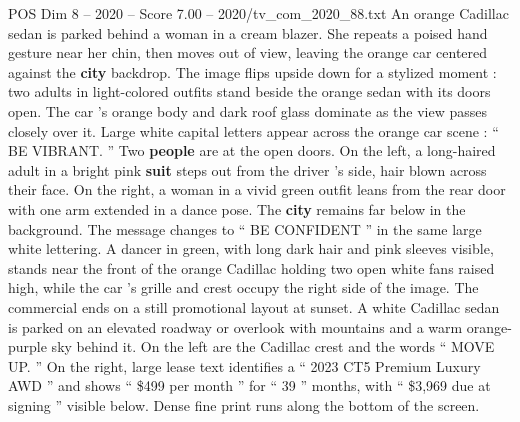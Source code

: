 \begin{textsample}{POS Dim 8 – 2020 – Score 7.00 – 2020/tv\_com\_2020\_88.txt}
An orange Cadillac sedan is parked behind a woman in a cream blazer.
She repeats a poised hand gesture near her chin, then moves out of view, leaving the orange car centered against the \textbf{city} backdrop.
The image flips upside down for a stylized moment : two adults in light-colored outfits stand beside the orange sedan with its doors open.
The car ’s orange body and dark roof glass dominate as the view passes closely over it.
Large white capital letters appear across the orange car scene : “ BE VIBRANT. ” Two \textbf{people} are at the open doors.
On the left, a long-haired adult in a bright pink \textbf{suit} steps out from the driver ’s side, hair blown across their face.
On the right, a woman in a vivid green outfit leans from the rear door with one arm extended in a dance pose.
The \textbf{city} remains far below in the background.
The message changes to “ BE CONFIDENT ” in the same large white lettering.
A dancer in green, with long dark hair and pink sleeves visible, stands near the front of the orange Cadillac holding two open white fans raised high, while the car ’s grille and crest occupy the right side of the image.
The commercial ends on a still promotional layout at sunset.
A white Cadillac sedan is parked on an elevated roadway or overlook with mountains and a warm orange-purple sky behind it.
On the left are the Cadillac crest and the words “ MOVE UP. ” On the right, large lease text identifies a “ 2023 CT5 Premium Luxury AWD ” and shows “ \$499 per month ” for “ 39 ” months, with “ \$3,969 due at signing ” visible below.
Dense fine print runs along the bottom of the screen.

\end{textsample}
